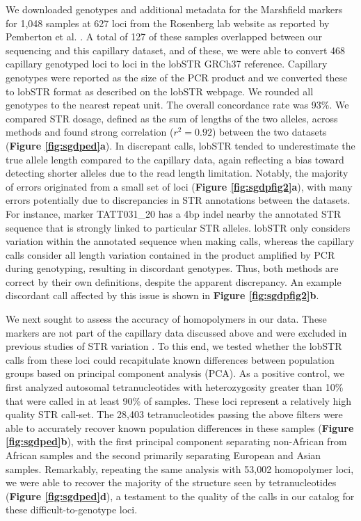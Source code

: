 We downloaded genotypes and additional metadata for the Marshfield markers for 1,048 samples at 627 loci from the Rosenberg lab website as reported by Pemberton et al. \cite{PembertonSandefurJakobssonEtAl2009}. A total of 127 of these samples overlapped between our sequencing and this capillary dataset, and of these, we were able to convert 468 capillary genotyped loci to loci in the lobSTR GRCh37 reference. Capillary genotypes were reported as the size of the PCR product and we converted these to lobSTR format as described on the lobSTR webpage. We rounded all genotypes to the nearest repeat unit. The overall concordance rate was 93\%. We compared STR dosage, defined as the sum of lengths of the two alleles, across methods and found strong correlation ($r^2=0.92$) between the two datasets (\textbf{Figure \ref{fig:sgdped}a}). In discrepant calls, lobSTR tended to underestimate the true allele length compared to the capillary data, again reflecting a bias toward detecting shorter alleles due to the read length limitation. Notably, the majority of errors originated from a small set of loci (\textbf{Figure \ref{fig:sgdpfig2}a}), with many errors potentially due to discrepancies in STR annotations between the datasets. For instance, marker TATT031\_20 has a 4bp indel nearby the annotated STR sequence that is strongly linked to particular STR alleles. lobSTR only considers variation within the annotated sequence when making calls, whereas the capillary calls consider all length variation contained in the product amplified by PCR during genotyping, resulting in discordant genotypes. Thus, both methods are correct by their own definitions, despite the apparent discrepancy. An example discordant call affected by this issue is shown in \textbf{Figure \ref{fig:sgdpfig2}b}. 

We next sought to assess the accuracy of homopolymers in our data. These markers are not part of the capillary data discussed above and were excluded in previous studies of STR variation \cite{WillemsGymrekHighnamEtAl2014}. To this end, we tested whether the lobSTR calls from these loci could recapitulate known differences between population groups based on principal component analysis (PCA). As a positive control, we first analyzed autosomal tetranucleotides with heterozygosity greater than 10\% that were called in at least 90\% of samples. These loci represent a relatively high quality STR call-set. The 28,403 tetranucleotides passing the above filters were able to accurately recover known population differences in these samples (\textbf{Figure \ref{fig:sgdped}b}), with the first principal component separating non-African from African samples and the second primarily separating European and Asian samples. Remarkably, repeating the same analysis with 53,002 homopolymer loci, we were able to recover the majority of the structure seen by tetranucleotides (\textbf{Figure \ref{fig:sgdped}d}), a testament to the quality of the calls in our catalog for these difficult-to-genotype loci.

